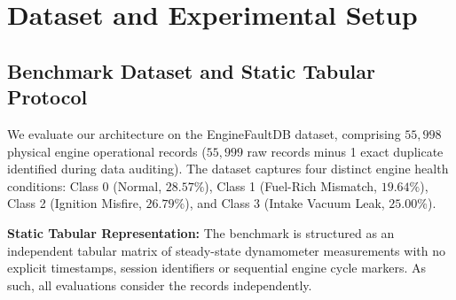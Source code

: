 \documentclass[journal]{IEEEtran}
\begin{document}
\section{Dataset and Experimental Setup}

\begin{table}[t]
\centering
\caption{EngineFaultDB Class Distribution and Partitioning}
\label{tab:dataset}
\end{table}

\subsection{Benchmark Dataset and Static Tabular Protocol}
We evaluate our architecture on the EngineFaultDB dataset, comprising $55,998$ physical engine operational records ($55,999$ raw records minus 1 exact duplicate identified during data auditing). The dataset captures four distinct engine health conditions: Class 0 (Normal, $28.57\%$), Class 1 (Fuel-Rich Mismatch, $19.64\%$), Class 2 (Ignition Misfire, $26.79\%$), and Class 3 (Intake Vacuum Leak, $25.00\%$).

\textbf{Static Tabular Representation:} The benchmark is structured as an independent tabular matrix of steady-state dynamometer measurements with no explicit timestamps, session identifiers or sequential engine cycle markers. As such, all evaluations consider the records independently.
\end{document}
